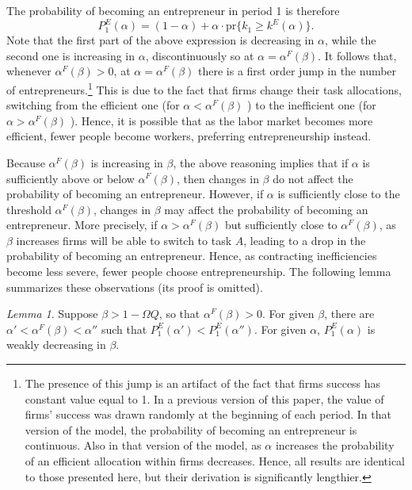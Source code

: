 \documentclass[12pt,american]{paper}
\theoremstyle{remark}
\newtheorem{lemma}{Lemma}
\begin{document}
 The probability of becoming an entrepreneur in period 1 is therefore
 \[
 P^E_1(\alpha) = (1-\alpha) + \alpha \cdot \mbox{pr}\{k_1 \geq k^E (\alpha) \}.
 \]
 Note that the first part of the above expression is decreasing in $\alpha$, while the second one is increasing in $\alpha$, discontinuously so at $\alpha=\alpha^F(\beta)$. It follows that, whenever $\alpha^F(\beta) > 0$, at $\alpha=\alpha^F(\beta)$ there is a first order jump in the number of entrepreneurs.\footnote{The presence of this jump is an artifact of the fact that firms success has constant value equal to 1. In a previous version of this paper, the value of firms' success was drawn randomly at the beginning of each period. In that version of the model, the probability of becoming an entrepreneur is continuous. Also in that version of the model, as $\alpha$ increases the probability of an efficient allocation within firms decreases. Hence, all results are identical to those presented here, but their derivation is significantly lengthier. }   This is due to the fact that firms change their task allocations, switching from the efficient one (for $\alpha<\alpha^F(\beta)$ ) to the inefficient one (for $\alpha>\alpha^F(\beta)$ ). Hence, it is possible that as the labor market becomes more efficient, fewer people become workers, preferring entrepreneurship instead. 
 
Because $\alpha^F(\beta)$ is increasing in $\beta$, the above reasoning implies that if $\alpha$ is sufficiently above or below $\alpha^F(\beta)$, then changes in $\beta$ do not affect the probability of becoming an entrepreneur. However, if $\alpha$ is sufficiently close to the threshold $\alpha^F(\beta)$, changes in $\beta$ may affect the probability of becoming an entrepreneur. More precisely, if $\alpha>\alpha^F(\beta)$ but sufficiently close to $\alpha^F(\beta)$, as $\beta$ increases firms will be able to switch to task $A$, leading to a drop in the probability of becoming an entrepreneur. Hence, as contracting inefficiencies become less severe, fewer people choose entrepreneurship. The following lemma summarizes these observations (its proof is omitted).
\begin{lemma}\label{lem: p1}
Suppose $\beta>1-\Omega Q$, so that $\alpha^F(\beta) > 0$. For given $\beta$, there are $\alpha'<\alpha^F(\beta)<\alpha''$ such that $P^E_1(\alpha')<P^E_1(\alpha'')$. For given $\alpha$, $P^E_1(\alpha)$ is weakly decreasing in $\beta$.
\end{lemma}
\end{document}
